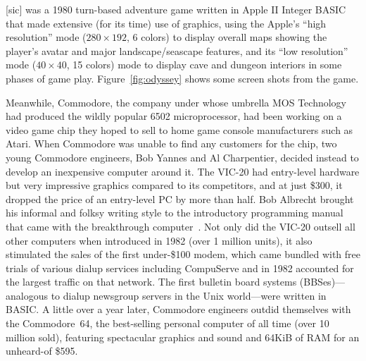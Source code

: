  [sic] was a 1980 turn-based adventure game
written in Apple II Integer BASIC
that made extensive (for its time) use of
graphics, using the Apple's ``high resolution'' mode ($280\times 192$, 6 colors)
to display overall maps showing the player's
avatar and major landscape/seascape features, and its
``low resolution'' mode ($40\times 40$, 15
colors) mode to display cave and dungeon interiors in some phases of game play.
Figure~\ref{fig:odyssey} shows some screen shots from the game.


Meanwhile, Commodore, the company under whose umbrella MOS Technology
had produced the wildly popular 6502 microprocessor, had been working on
a video game chip they hoped to sell to home game console manufacturers
such as Atari.
When Commodore was unable to find any customers for the chip, two young
Commodore engineers, Bob Yannes and Al Charpentier, decided instead to
develop an inexpensive computer around it.
The VIC-20 had entry-level hardware but very impressive graphics
compared to its competitors, and at just \$300, it dropped the price
of an entry-level PC by more than half.
Bob Albrecht brought his informal and folksy writing style to the
introductory programming manual that came with the breakthrough
computer~\cite{commodore}.
Not only did the VIC-20 outsell all other computers when introduced in
1982 (over 1 million units), it also stimulated the sales of the first
under-\$100 modem, which came bundled with free trials of various dialup
services including CompuServe and in 1982 accounted for the largest
traffic on that network.
The first bulletin board systems (BBSes)---analogous to dialup
newsgroup servers in the Unix world---were written in BASIC.
A little over a year later, Commodore engineers outdid themselves with
the Commodore~64, the best-selling personal computer of all time (over
10 million sold), featuring spectacular graphics and sound and 64KiB
of RAM for an unheard-of \$595.

